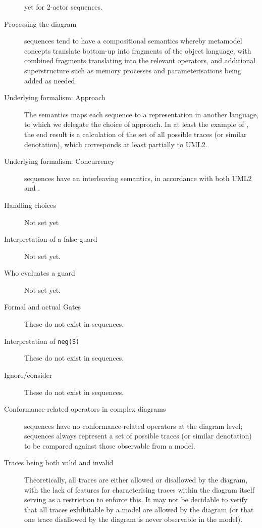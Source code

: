 \begin{description}
{  yet for 2-actor sequences.}
\item[Processing the diagram]
  \langname{} sequences tend to have a compositional semantics whereby metamodel
  concepts translate bottom-up into fragments of
  the object language, with combined fragments translating into the relevant
  operators,
  and additional superstructure such as memory processes and parameterisations
  being added as needed.
\item[Underlying formalism: Approach]
  The \langname{} semantics maps each sequence to a representation in another
  language, to which we delegate the choice of approach.
  In at least the example of \tockcsp, the end result is a calculation of the
  set of all possible traces (or similar denotation), which corresponds at
  least partially to UML2.
\item[Underlying formalism: Concurrency]
  \langname{} sequences have an interleaving semantics, in accordance with
  both UML2 and \tockcsp.
\item[Handling choices]
  Not set yet
\item[Interpretation of a false guard]
  Not set yet.
\item[Who evaluates a guard]
  Not set yet.
\item[Formal and actual Gates]
  These do not exist in \langname{} sequences.
\item[Interpretation of \texttt{neg(S)}]
  These do not exist in \langname{} sequences.
\item[Ignore/consider]
  These do not exist in \langname{} sequences.
\item[Conformance-related operators in complex diagrams]
  \langname{} sequences have no conformance-related operators at the diagram
  level; sequences always represent a set of possible traces (or similar
  denotation) to be compared against those observable from a model.
\item[Traces being both valid and invalid]
  Theoretically, all traces are either allowed or disallowed by the diagram,
  with the lack of features for characterising traces within the diagram itself
  serving as a restriction to enforce this.  It may not
  be decidable to verify that all traces exhibitable by a model are allowed by
  the diagram (or that one trace disallowed by the diagram is never observable
  in the model).
\end{description}
